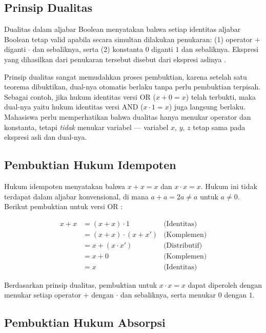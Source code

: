 \subsection{Prinsip Dualitas}

\begin{definisi}
Dualitas dalam aljabar Boolean menyatakan bahwa setiap identitas aljabar Boolean tetap valid apabila secara simultan dilakukan penukaran: (1) operator $+$ diganti $\cdot$ dan sebaliknya, serta (2) konstanta $0$ diganti $1$ dan sebaliknya. Ekspresi yang dihasilkan dari penukaran tersebut disebut  dari ekspresi aslinya \cite{rosen2019}.
\end{definisi}

Prinsip dualitas sangat memudahkan proses pembuktian, karena setelah satu teorema dibuktikan, dual-nya otomatis berlaku tanpa perlu pembuktian terpisah. Sebagai contoh, jika hukum identitas versi OR ($x + 0 = x$) telah terbukti, maka dual-nya yaitu hukum identitas versi AND ($x \cdot 1 = x$) juga langsung berlaku. Mahasiswa perlu memperhatikan bahwa dualitas hanya menukar operator dan konstanta, tetapi \emph{tidak} menukar variabel --- variabel $x$, $y$, $z$ tetap sama pada ekspresi asli dan dual-nya.

\subsection{Pembuktian Hukum Idempoten}

Hukum idempoten menyatakan bahwa $x + x = x$ dan $x \cdot x = x$. Hukum ini tidak terdapat dalam aljabar konvensional, di mana $a + a = 2a \neq a$ untuk $a \neq 0$. Berikut pembuktian untuk versi OR \cite{rosen2019}:

\begin{align*}
x + x &= (x + x) \cdot 1 & \text{(Identitas)} \\
      &= (x + x) \cdot (x + x') & \text{(Komplemen)} \\
      &= x + (x \cdot x') & \text{(Distributif)} \\
      &= x + 0 & \text{(Komplemen)} \\
      &= x & \text{(Identitas)}
\end{align*}

Berdasarkan prinsip dualitas, pembuktian untuk $x \cdot x = x$ dapat diperoleh dengan menukar setiap operator $+$ dengan $\cdot$ dan sebaliknya, serta menukar $0$ dengan $1$.

\subsection{Pembuktian Hukum Absorpsi}

